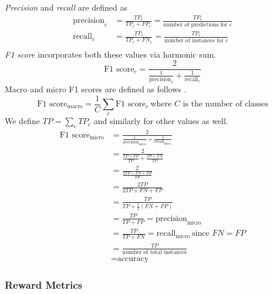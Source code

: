 \documentclass{article}
\begin{document}
\textit{Precision} and \textit{recall} are defined as
\begin{align}
    \text{precision}_c &= \frac{TP_c}{TP_c + FP_c} = \frac{TP_c}{\text{number of predictions for $c$}} \label{prec}\\
    \text{recall}_c &= \frac{TP_c}{TP_c + FN_c} = \frac{TP_c}{\text{number of instances for $c$}} \label{recall}\\
\end{align}
\textit{F1 score} incorporates both these values via harmonic sum.
\begin{equation}
    \text{F1 score}_c = \frac{2}{\frac{1}{\text{precision}_c} + \frac{1}{\text{recall}_c}}
\end{equation}
Macro and micro F1 scores are defined as follows \cite{leung_micro_2022}.
\begin{equation}
    \text{F1 score}_\text{macro} = \frac{1}{C}\sum_c \text{F1 score}_c\ \scriptstyle{\text{where $C$ is the number of classes}}
\end{equation}
We define $TP = \sum_c TP_c$ and similarly for other values as well.
\begin{align}
    \text{F1 score}_\text{micro}
    &= \frac{2}{\frac{1}{\text{precision}_\text{micro}} + \frac{1}{\text{recall}_\text{micro}}}\\
    &= \frac{2}{\frac{TP+FP}{TP} + \frac{TP+FN}{TP}}\\
    &= \frac{2}{\frac{2TP+FN+FP}{TP}}\\
    &= \frac{2TP}{2TP+FN+FP}\\
    &= \frac{TP}{TP+\frac{1}{2}(FN+FP)}\\
    &= \frac{TP}{TP+FP} = \text{precision}_\text{micro}\\
    &= \frac{TP}{TP+FN} = \text{recall}_\text{micro}\ \scriptstyle{\text{since $FN=FP$}}\\
    &= \frac{TP}{\text{number of total instances}}\\
    &= \text{accuracy}
\end{align}
\subsubsection{Reward Metrics}
\end{document}
